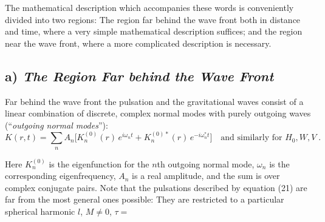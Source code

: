 The mathematical description which accompanies these words is conveniently divided
into two regions: The region far behind the wave front both in distance and time, where
a very simple mathematical description suffices; and the region near the wave front,
where a more complicated description is necessary.

\subsection*{a) \textit{The Region Far behind the Wave Front}}

Far behind the wave front the pulsation and the gravitational waves consist of a
linear combination of discrete, complex normal modes with purely outgoing waves
(``\textit{outgoing normal modes}''):
\begin{equation}
  K(r,t) = \sum_n A_n \bigl[ K_n^{(0)}(r)\, e^{i\omega_n t} + K_n^{(0)*}(r)\, e^{-i\omega_n^* t} \bigr]
  \quad \text{and similarly for } H_0, W, V \;.
\label{eq:21}
\end{equation}

Here $K_n^{(0)}$ is the eigenfunction for the $n$th outgoing normal mode, $\omega_n$ is the
corresponding eigenfrequency, $A_n$ is a real amplitude, and the sum is over complex
conjugate pairs. Note that the pulsations described by equation (21) are far from the
most general ones possible: They are restricted to a particular spherical harmonic
$l$, $M \neq 0$, $\tau =$
